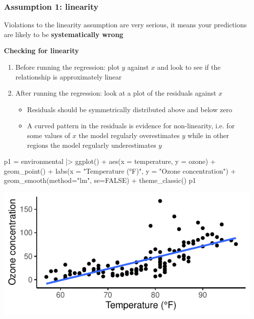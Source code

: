 \documentclass[a4paper]{article}
\begin{document}
\subsubsection{Assumption 1: linearity}
\begin{goldbox}
	Violations to the linearity assumption are very serious, it means your predictions are likely to be \textcolor{myblue}{\textbf{systematically wrong}}
\end{goldbox}
\textbf{Checking for linearity}
\begin{enumerate}
	\item Before running the regression: plot \( y \) against \( x \) and look to see if the relationship is approximately linear
	\item After running the regression: look at a plot of the residuals against \( x \)
	\begin{itemize}
		\item Residuals should be symmetrically distributed above and below zero
		\item A curved pattern in the residuals is evidence for non-linearity, i.e. for some values of \( x \) the model regularly overestimates \( y \) while in other regions the model regularly underestimates \( y \) 
	\end{itemize}
\end{enumerate}
\begin{minipage}[t]{0.49\textwidth}
\begin{Schunk}
\begin{Sinput}
p1 = environmental |> ggplot() + 
  aes(x = temperature, y = ozone) + 
  geom_point() + 
  labs(x = "Temperature (°F)",
       y = "Ozone concentration") +
  geom_smooth(method="lm", se=FALSE) +
  theme_classic()
p1
\end{Sinput}


{\centering \includegraphics[width=\maxwidth]{figure/listings-unnamed-chunk-343-1} 

}

\end{Schunk}
\end{minipage}
\end{document}
